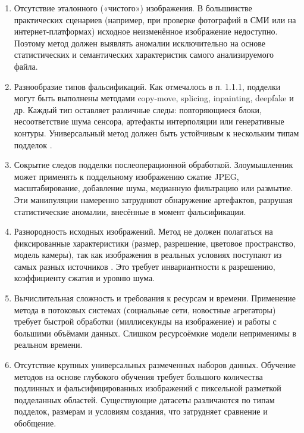 \begin{enumerate}
	\item Отсутствие эталонного («чистого») изображения. В большинстве практических сценариев (например, при проверке фотографий в СМИ или на интернет-платформах) исходное неизменённое изображение недоступно. Поэтому метод должен выявлять аномалии исключительно на основе статистических и семантических характеристик самого анализируемого файла.
	
	\item Разнообразие типов фальсификаций. Как отмечалось в п. 1.1.1, подделки могут быть выполнены методами copy-move, splicing, inpainting, deepfake и др. Каждый тип оставляет различные следы: повторяющиеся блоки, несоответствие шума сенсора, артефакты интерполяции или генеративные контуры. Универсальный метод должен быть устойчивым к нескольким типам подделок \cite{7}.
	
	\item Сокрытие следов подделки послеоперационной обработкой. Злоумышленник может применять к поддельному изображению сжатие JPEG, масштабирование, добавление шума, медианную фильтрацию или размытие. Эти манипуляции намеренно затрудняют обнаружение артефактов, разрушая статистические аномалии, внесённые в момент фальсификации.
	
	\item Разнородность исходных изображений. Метод не должен полагаться на фиксированные характеристики (размер, разрешение, цветовое пространство, модель камеры), так как изображения в реальных условиях поступают из самых разных источников \cite{8}. Это требует инвариантности к разрешению, коэффициенту сжатия и уровню шума.
	
	\item Вычислительная сложность и требования к ресурсам и времени. Применение метода в потоковых системах (социальные сети, новостные агрегаторы) требует быстрой обработки (миллисекунды на изображение) и работы с большими объёмами данных. Слишком ресурсоёмкие модели неприменимы в реальном времени.

	\item Отсутствие крупных универсальных размеченных наборов данных. Обучение методов на основе глубокого обучения требует большого количества подлинных и фальсифицированных изображений с пиксельной разметкой подделанных областей. Существующие датасеты различаются по типам подделок, размерам и условиям создания, что затрудняет сравнение и обобщение.
\end{enumerate}


